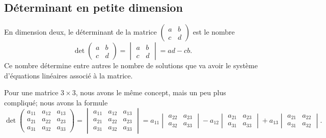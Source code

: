 \subsection{Déterminant en petite dimension}

En dimension deux, le déterminant de la matrice
\( \begin{pmatrix}
	a & b \\
	c & d
\end{pmatrix}\)
est le nombre
\begin{equation}        \label{EQooQRGVooChwRMd}
	\det\begin{pmatrix}
		a & b \\
		c & d
	\end{pmatrix}=\begin{vmatrix}
		a & b \\
		c & d
	\end{vmatrix}=ad-cb.
\end{equation}
Ce nombre détermine entre autres le nombre de solutions que va avoir le système d'équations linéaires associé à la matrice.

Pour une matrice \( 3\times 3\), nous avons le même concept, mais un peu plus compliqué; nous avons la formule
\begin{equation}
	\det
	\begin{pmatrix}
		a_{11} & a_{12} & a_{13} \\
		a_{21} & a_{22} & a_{23} \\
		a_{31} & a_{32} & a_{33}
	\end{pmatrix}
	=
	\begin{vmatrix}
		a_{11} & a_{12} & a_{13} \\
		a_{21} & a_{22} & a_{23} \\
		a_{31} & a_{32} & a_{33}
	\end{vmatrix}=
	a_{11}\begin{vmatrix}
		a_{22} & a_{23} \\
		a_{32} & a_{33}
	\end{vmatrix}-
	a_{12}\begin{vmatrix}
		a_{21} & a_{23} \\
		a_{31} & a_{33}
	\end{vmatrix}+
	a_{13}\begin{vmatrix}
		a_{21} & a_{22} \\
		a_{31} & a_{32}
	\end{vmatrix}.
\end{equation}


